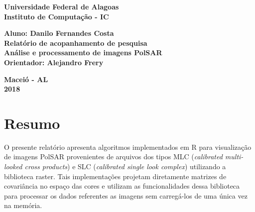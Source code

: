 \documentclass[12pt]{article}
\begin{document}
\begin{titlepage}
\begin{center}

\textbf{\LARGE Universidade Federal de Alagoas } \\[0.5cm]
\textbf{\large Instituto de Computação - IC}\\[0.2cm]

\vspace{20pt}

\vspace{20pt}
\vspace{20pt}
\vspace{20pt}
\vspace{20pt}
\vspace{20pt}
\vspace{20pt}
\vspace{20pt}
\vspace{20pt}

\textbf{\Large Aluno: Danilo Fernandes Costa}\\
\vspace{70pt}
\textbf{\LARGE Relatório de acopanhamento de pesquisa}\\
\vspace{20pt}
\textbf{\Large Análise e processamento de imagens PolSAR}\\
\vspace{70pt}
\textbf{\large Orientador: Alejandro Frery}\\

\vspace{45pt}
\end{center}

\par
\vfill
\begin{center}
\textbf{Maceió - AL}\\
\textbf{2018}
\end{center}

\end{titlepage}

\newpage

\section{Resumo}

O presente relatório apresenta algoritmos implementados em R para visualização de imagens PolSAR provenientes de arquivos dos tipos MLC (\textit{calibrated multi-looked cross products}) e SLC (\textit{calibrated single look complex}) utilizando a biblioteca raster. Tais implementações projetam diretamente matrizes de covariância no espaço das cores e utilizam as funcionalidades dessa biblioteca para processar os dados referentes as imagens sem carregá-los de uma única vez na memória.
\end{document}
